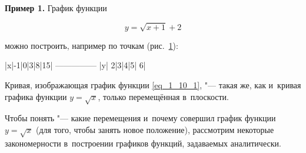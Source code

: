 \textbf{Пример 1.}\label{ex_1_10_1} График функции

\begin{equation}\label{eq_1_10_1}
y = \sqrt{x+1} + 2
\end{equation}

можно построить, например по точкам (рис.\ \ref{fig_1_10_19}):

|x|-1|0|3|8|15|
---------------
|y| 2|3|4|5| 6|

\begin{figure}\label{fig_1_10_19}
\end{figure}

Кривая, изображающая график функции \eqref{eq_1_10_1}, "--- такая же, как и~кривая графика
функции $y = \sqrt{x}$, только перемещённая в~плоскости.

Чтобы понять "--- какие перемещения и~почему совершил график функции $y = \sqrt{x}$
(для того, чтобы занять новое положение), рассмотрим некоторые закономерности
в~построении графиков функций, задаваемых аналитически.
